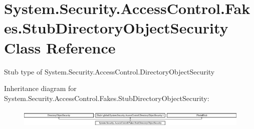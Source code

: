 \hypertarget{class_system_1_1_security_1_1_access_control_1_1_fakes_1_1_stub_directory_object_security}{\section{System.\-Security.\-Access\-Control.\-Fakes.\-Stub\-Directory\-Object\-Security Class Reference}
\label{class_system_1_1_security_1_1_access_control_1_1_fakes_1_1_stub_directory_object_security}
}


Stub type of System.\-Security.\-Access\-Control.\-Directory\-Object\-Security 


Inheritance diagram for System.\-Security.\-Access\-Control.\-Fakes.\-Stub\-Directory\-Object\-Security\-:\begin{figure}[H]
\begin{center}
\leavevmode
\includegraphics[height=0.870241cm]{class_system_1_1_security_1_1_access_control_1_1_fakes_1_1_stub_directory_object_security}
\end{center}
\end{figure}
